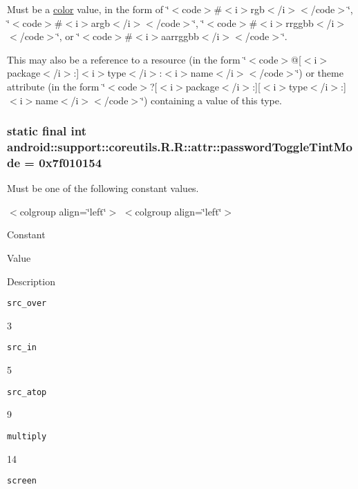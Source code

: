 Must be a \hyperlink{classandroid_1_1support_1_1coreutils_1_1_r_1_1color}{color} value, in the form of \char`\"{}$<$code$>$\#$<$i$>$rgb$<$/i$>$$<$/code$>$\char`\"{}, \char`\"{}$<$code$>$\#$<$i$>$argb$<$/i$>$$<$/code$>$\char`\"{}, \char`\"{}$<$code$>$\#$<$i$>$rrggbb$<$/i$>$$<$/code$>$\char`\"{}, or \char`\"{}$<$code$>$\#$<$i$>$aarrggbb$<$/i$>$$<$/code$>$\char`\"{}. 

This may also be a reference to a resource (in the form \char`\"{}$<$code$>$@\mbox{[}$<$i$>$package$<$/i$>$:\mbox{]}$<$i$>$type$<$/i$>$:$<$i$>$name$<$/i$>$$<$/code$>$\char`\"{}) or theme attribute (in the form \char`\"{}$<$code$>$?\mbox{[}$<$i$>$package$<$/i$>$:\mbox{]}\mbox{[}$<$i$>$type$<$/i$>$:\mbox{]}$<$i$>$name$<$/i$>$$<$/code$>$\char`\"{}) containing a value of this type. \hypertarget{classandroid_1_1support_1_1coreutils_1_1_r_1_1attr_098cd30acf9d6190c67bf369e67c912d}{
\subsubsection[{passwordToggleTintMode}]{\setlength{\rightskip}{0pt plus 5cm}static final int android::support::coreutils.R.R::attr::passwordToggleTintMode = 0x7f010154}}
\label{classandroid_1_1support_1_1coreutils_1_1_r_1_1attr_098cd30acf9d6190c67bf369e67c912d}


Must be one of the following constant values. \begin{TabularC}{0}
\hline
\end{TabularC}
$<$colgroup align=\char`\"{}left\char`\"{}$>$ $<$colgroup align=\char`\"{}left\char`\"{}$>$ 

Constant

Value

Description 

{\tt src\_\-over}

3

{\tt src\_\-in}

5

{\tt src\_\-atop}

9

{\tt multiply}

14

{\tt screen}


